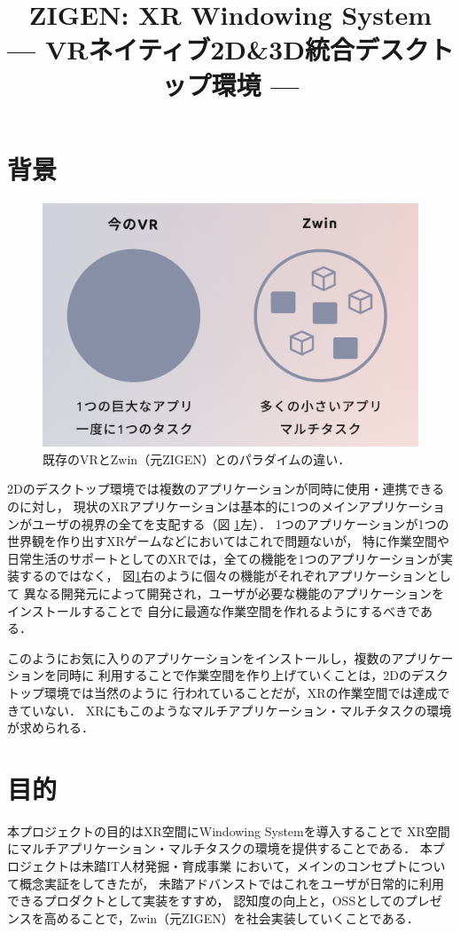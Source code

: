 \documentclass[12pt,a4paper]{jsarticle}
\title{
  ZIGEN: XR Windowing System\\
  --- VRネイティブ2D\&3D統合デスクトップ環境 --- 
}
\date{\vspace{-5em}}
\begin{document}
\maketitle

\section{背景}

\begin{figure}[htbp]
  \centering
  \includegraphics[keepaspectratio, width=0.6\linewidth]{fig/apps.png}
  \caption{既存のVRとZwin（元ZIGEN）とのパラダイムの違い．}
  \label{fig:apps}
\end{figure}

2Dのデスクトップ環境では複数のアプリケーションが同時に使用・連携できるのに対し， 
現状のXRアプリケーションは基本的に1つのメインアプリケーションがユーザの視界の全てを支配する（図 \ref{fig:apps}左）．
1つのアプリケーションが1つの世界観を作り出すXRゲームなどにおいてはこれで問題ないが，
特に作業空間や日常生活のサポートとしてのXRでは，全ての機能を1つのアプリケーションが実装するのではなく，
図\ref{fig:apps}右のように個々の機能がそれぞれアプリケーションとして
異なる開発元によって開発され，ユーザが必要な機能のアプリケーションをインストールすることで
自分に最適な作業空間を作れるようにするべきである．

このようにお気に入りのアプリケーションをインストールし，複数のアプリケーションを同時に
利用することで作業空間を作り上げていくことは，2Dのデスクトップ環境では当然のように
行われていることだが，XRの作業空間では達成できていない．
XRにもこのようなマルチアプリケーション・マルチタスクの環境が求められる．

\section{目的}
本プロジェクトの目的はXR空間にWindowing Systemを導入することで
XR空間にマルチアプリケーション・マルチタスクの環境を提供することである．
本プロジェクトは未踏IT人材発掘・育成事業
において，メインのコンセプトについて概念実証をしてきたが，
未踏アドバンストではこれをユーザが日常的に利用できるプロダクトとして実装をすすめ，
認知度の向上と，OSSとしてのプレゼンスを高めることで，Zwin（元ZIGEN）を社会実装していくことである．
\end{document}
